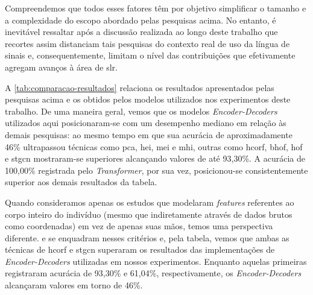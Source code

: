 Compreendemos que todos esses fatores têm por objetivo simplificar o tamanho e a complexidade do escopo abordado pelas pesquisas acima. No entanto, é inevitável ressaltar após a discussão realizada ao longo deste trabalho que recortes assim distanciam tais pesquisas do contexto real de uso da língua de sinais e, consequentemente, limitam o nível das contribuições que efetivamente agregam avanços à área de \acrshort{slr}.







A \autoref{tab:comparacao-resultados} relaciona os resultados apresentados pelas pesquisas acima e os obtidos pelos modelos utilizados nos experimentos deste trabalho.
De uma maneira geral, vemos que os modelos \textit{Encoder-Decoders} utilizados aqui posicionaram-se com um desempenho mediano em relação às demais pesquisas: ao mesmo tempo em que sua acurácia de aproximadamente 46\% ultrapassou técnicas como \acrshort{pca}, \acrshort{hei}, \acrshort{mei} e \acrshort{mhi}, outras como \acrshort{hcorf}, \acrshort{bhof}, \acrshort{hof} e \acrshort{stgcn} mostraram-se superiores alcançando valores de até 93,30\%.
A acurácia de 100,00\% registrada pelo \textit{Transformer}, por sua vez, posicionou-se consistentemente superior aos demais resultados da tabela.

Quando consideramos apenas os estudos que modelaram \textit{features} referentes ao corpo inteiro do indivíduo (mesmo que indiretamente através de dados brutos como coordenadas) em vez de apenas suas mãos, temos uma perspectiva diferente.  e  se enquadram nesses critérios e, pela tabela, vemos que ambas as técnicas de \acrshort{hcorf} e \acrshort{stgcn} superaram os resultados das implementações de \textit{Encoder-Decoders} utilizadas em nossos experimentos. Enquanto aquelas primeiras registraram acurácia de 93,30\% e 61,04\%, respectivamente, os \textit{Encoder-Decoders} alcançaram valores em torno de 46\%.


